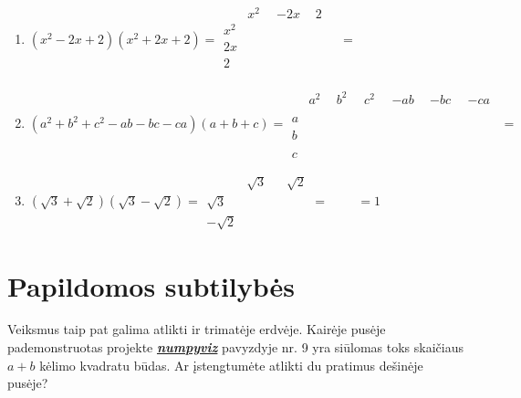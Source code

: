 \documentclass{article}
\def\ph#1{\phantom{#1}}
\begin{document}
\begin{enumerate}
     \item $(x^2-2x+2)(x^2+2x+2) = 
    \begin{array}{c||c|c|c}
     & x^2 & -2x & 2 \\
     \hline
     x^2 & \ph{x^4} & \ph{-2x^3 }& \ph{2x^2} \\
     \hline
     2x & \ph{2x^3} & \ph{4x^2} & \ph{4x} \\
     \hline
     2 & \ph{2x^2} & \ph{-4x^2} & \ph{4} \\
     \end{array} = 
     \ph{x^4+4}$
     
     \item $(a^2+b^2+c^2-ab-bc-ca)(a+b+c) = 
    \begin{array}{c||c|c|c|c|c|c}
     & a^2 & b^2 & c^2 & -ab & -bc & -ca \\
     \hline
     a & \ph{a^3} & \ph{ab^2} & \ph{ac^2} & \ph{-a^2b} & \ph{-abc} & \ph{-a^2c}\\
     \hline
     b & \ph{a^2b} & \ph{b^3} & \ph{c^2 b} & \ph{-ab^2} & \ph{-ab^2} & \ph{-abc}\\
     \hline
     c & \ph{a^2 c} & \ph{b^2c} & \ph{c^3} & \ph{-abc} & \ph{-bc^2} & \ph{-ac^2}
     \end{array} = 
     \ph{a^3+b^3+c^3-3abc}$
     
     \item $(\sqrt{3}+\sqrt{2})(\sqrt{3}-\sqrt{2}) = 
    \begin{array}{c||c|c}
     & \sqrt{3} & \sqrt{2} \\
     \hline
     \sqrt{3} & \ph{3} & \ph{\sqrt{6}} \\
     \hline
     -\sqrt{2} & \ph{-\sqrt{6}} & \ph{-2}
     \end{array} = 
     \ph{3 - 2} = 1$
\end{enumerate}
\section*{Papildomos subtilybės}
Veiksmus taip pat galima atlikti ir trimatėje erdvėje. Kairėje pusėje pademonstruotas projekte \href{https://github.com/loijord/numpyviz/}{\textit{\textbf{numpyviz}}} pavyzdyje nr. 9 yra siūlomas toks skaičiaus $a+b$ kėlimo kvadratu būdas. Ar įstengtumėte atlikti du pratimus dešinėje pusėje?
\end{document}
